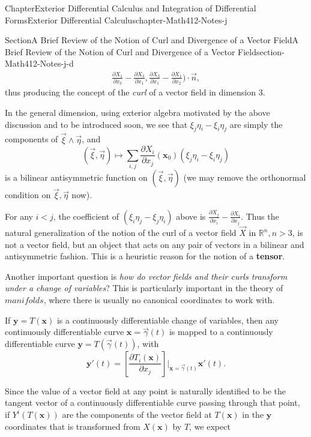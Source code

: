 \documentclass[oneside,10pt,]{book}
\newcommand{\terminology}[1]{\textbf{#1}}
\numberwithin{equation}{section}
\newcommand{\bbR}{\mathbb{R}}
\newcommand{\lt}{<}
\begin{document}
\begin{chapterptx}{Chapter}{Exterior Differential Calculus and Integration of Differential Forms}{}{Exterior Differential Calculus}{}{}{chapter-Math412-Notes-j}
\begin{sectionptx}{Section}{A Brief Review of the Notion of Curl and Divergence of a Vector Field}{}{A Brief Review of the Notion of Curl and Divergence of a Vector Field}{}{}{section-Math412-Notes-j-d}
\begin{align*}
\frac{\partial X_1}{\partial x_3}-\frac{\partial X_3}{\partial x_1},
\frac{\partial X_2}{\partial x_1}-\frac{\partial X_1}{\partial x_2})\cdot \vec{n},
\end{align*}
thus producing the concept of the \emph{curl} of a vector field in dimension \(3\).%
\par
In the general dimension, using exterior algebra motivated by the above discussion and to be introduced soon, we see that \(\xi_j\eta_i - \xi_i\eta_j\) are simply the components of \(\vec{\xi}\wedge \vec{\eta}\), and%
\begin{equation*}
(\vec{\xi}, \vec{\eta}) \mapsto \sum_{i,j} \frac{\partial X_i}{\partial x_j}({\mathbf x}_{0}) 
\left(\xi_j\eta_i - \xi_i\eta_j  \right)
\end{equation*}
is a bilinear antisymmetric function on \((\vec{\xi}, \vec{\eta})\) (we may remove the orthonormal condition on \(\vec{\xi}, \vec{\eta}\) now).%
\par
For any \(i \lt j\), the coefficient of \((\xi_i\eta_j - \xi_j\eta_i)\) above is \(\frac{\partial X_j}{\partial x_i}- \frac{\partial X_i}{\partial x_j}\). Thus the natural generalization of the notion of the curl of a vector field \(\vec{X}\) in \(\bbR^{n}, n>3\), is not a vector field, but an object that acts on any pair of vectors in a bilinear and antisymmetric fashion. This is a heuristic reason for the notion of a \terminology{tensor}.%
\par
Another important question is \emph{how do vector fields and their curls transform under a change of variables}? This is particularly important in the theory of \(manifolds\), where there is usually no canonical coordinates to work with.%
\par
If \({\mathbf y}=T({\mathbf x})\) is a continuously differentiable change of variables, then any continuously differentiable curve \({\mathbf x}=\vec{\gamma}(t)\) is mapped to a continuously differentiable curve \({\mathbf y}=T(\vec{\gamma}(t))\), with%
\begin{equation*}
{\mathbf y}'(t) =\left[\frac{\partial T_{i} ({\mathbf x})}{\partial x_{j}}\right]\Big|_{{\mathbf x}
=\vec{\gamma}(t)}
{\mathbf x}'(t).
\end{equation*}
%
\par
Since the value of a vector field at any point is naturally identified to be the tangent vector of a continuously differentiable curve passing through that point, if \(Y^{i}(T({\mathbf x}))\) are the components of the vector field at \(T({\mathbf x})\) in the \(\mathbf y\) coordinates that is transformed from \(X({\mathbf x})\) by \(T\), we expect%

\end{sectionptx}
\end{chapterptx}
\end{document}
